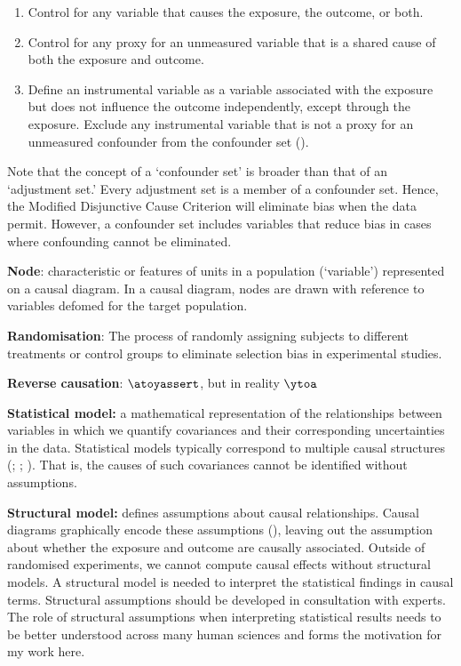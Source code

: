 \documentclass[
  singlecolumn]{article}
\providecommand{\tightlist}{%
  \setlength{\itemsep}{0pt}\setlength{\parskip}{0pt}}\usepackage{longtable,booktabs,array}
\begin{document}
\begin{enumerate}
\def\labelenumi{\alph{enumi}.}
\tightlist
\item
  Control for any variable that causes the exposure, the outcome, or
  both.
\item
  Control for any proxy for an unmeasured variable that is a shared
  cause of both the exposure and outcome.
\item
  Define an instrumental variable as a variable associated with the
  exposure but does not influence the outcome independently, except
  through the exposure. Exclude any instrumental variable that is not a
  proxy for an unmeasured confounder from the confounder set
  ().
\end{enumerate}

Note that the concept of a `confounder set' is broader than that of an
`adjustment set.' Every adjustment set is a member of a confounder set.
Hence, the Modified Disjunctive Cause Criterion will eliminate bias when
the data permit. However, a confounder set includes variables that
reduce bias in cases where confounding cannot be eliminated.

\textbf{Node}: characteristic or features of units in a population
(`variable') represented on a causal diagram. In a causal diagram, nodes
are drawn with reference to variables defomed for the target population.

\textbf{Randomisation}: The process of randomly assigning subjects to
different treatments or control groups to eliminate selection bias in
experimental studies.

\textbf{Reverse causation}: \(\atoyassert\), but in reality \(\ytoa\)

\textbf{Statistical model:} a mathematical representation of the
relationships between variables in which we quantify covariances and
their corresponding uncertainties in the data. Statistical models
typically correspond to multiple causal structures
(;
;
).
That is, the causes of such covariances cannot be identified without
assumptions.

\textbf{Structural model:} defines assumptions about causal
relationships. Causal diagrams graphically encode these assumptions
(), leaving out the
assumption about whether the exposure and outcome are causally
associated. Outside of randomised experiments, we cannot compute causal
effects without structural models. A structural model is needed to
interpret the statistical findings in causal terms. Structural
assumptions should be developed in consultation with experts. The role
of structural assumptions when interpreting statistical results needs to
be better understood across many human sciences and forms the motivation
for my work here.
\end{document}
